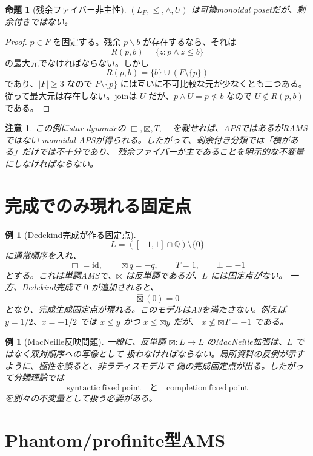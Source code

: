 \documentclass[uplatex,dvipdfmx,a4paper,10pt]{jsarticle}
\newtheorem{proposition}[theorem]{命題}
\newtheorem{example}[theorem]{例}
\newtheorem{remark}[theorem]{注意}
\newcommand{\bt}{\boxtimes}
\newcommand{\resl}{\backslash}
\newcommand{\Q}{\mathbb Q}
\begin{document}
\begin{proposition}[残余ファイバー非主性]
\((L_F,\le,\wedge,U)\) は可換monoidal posetだが、剰余付きではない。
\end{proposition}

\begin{proof}
\(p\in F\) を固定する。残余 \(p\resl b\) が存在するなら、それは
\[
R(p,b)=\{z:p\wedge z\le b\}
\]
の最大元でなければならない。しかし
\[
R(p,b)=\{b\}\cup(F\setminus\{p\})
\]
であり、\(|F|\ge3\) なので \(F\setminus\{p\}\) には互いに不可比較な元が少なくとも二つある。
従って最大元は存在しない。joinは \(U\) だが、\(p\wedge U=p\nleq b\) なので
\(U\notin R(p,b)\) である。
\end{proof}

\begin{remark}
この例にstar-dynamicの \(\Box,\bt,T,\bot\) を載せれば、APSではあるがRAMSではない
monoidal APSが得られる。したがって、剰余付き分類では「積がある」だけでは不十分であり、
残余ファイバーが主であることを明示的な不変量にしなければならない。
\end{remark}

\section{完成でのみ現れる固定点}

\begin{example}[Dedekind完成が作る固定点]
\[
L=([-1,1]\cap\Q)\setminus\{0\}
\]
に通常順序を入れ、
\[
\Box=\mathrm{id},\qquad \bt q=-q,\qquad T=1,\qquad \bot=-1
\]
とする。これは単調AMSで、\(\bt\) は反単調であるが、\(L\) には固定点がない。
一方、Dedekind完成で \(0\) が追加されると、
\[
\widehat{\bt}(0)=0
\]
となり、完成生成固定点が現れる。このモデルはA3を満たさない。例えば
\(y=1/2\)、\(x=-1/2\) では \(x\le y\) かつ \(x\le\bt y\) だが、
\(x\nleq\bt T=-1\) である。
\end{example}

\begin{example}[MacNeille反映問題]
一般に、反単調 \(\bt:L\to L\) のMacNeille拡張は、\(L\) ではなく双対順序への写像として
扱わなければならない。局所資料の反例が示すように、極性を誤ると、非ラティスモデルで
偽の完成固定点が出る。したがって分類理論では
\[
\mathrm{syntactic\ fixed\ point}
\quad\text{と}\quad
\mathrm{completion\ fixed\ point}
\]
を別々の不変量として扱う必要がある。
\end{example}

\section{Phantom/profinite型AMS}
\end{document}

